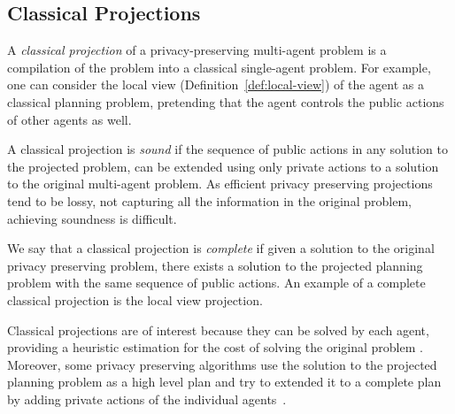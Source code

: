 \documentclass[letterpaper]{article}
\theoremstyle{definition}
\begin{document}
\subsection{Classical Projections}


A {\em classical projection} of a privacy-preserving multi-agent problem is a compilation of the problem into a classical single-agent problem. For example, one can consider the local view (Definition~\ref{def:local-view}) of the agent as a classical planning problem, pretending that the agent controls the public actions of other agents as well.

A classical projection is {\em sound} if the sequence of public actions in any solution to the projected problem, can be extended using only private actions  to a solution to the original multi-agent problem. As efficient privacy preserving projections tend to be lossy, not capturing all the information in the original problem, achieving soundness is difficult.

We say that a classical projection is {\em complete} if given a solution to the original privacy preserving problem, there exists a solution to the projected planning problem with the same sequence of public actions. An example of a complete classical projection is the local view projection. 


Classical projections are of interest because they can be solved by each agent, providing a heuristic estimation for the cost of solving the original problem \cite{nissim2014distributed}. Moreover, some privacy preserving algorithms use the solution to the projected planning problem as a high level plan and try to extended it to a complete plan by adding private actions of the individual agents~\cite{jakubuv2015multiagent,tozicka2015internally}.


\end{document}

